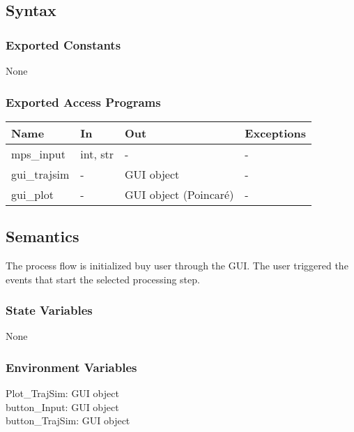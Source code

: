 \documentclass[12pt, titlepage]{article}
\begin{document}
\subsection{Syntax}

\subsubsection{Exported Constants}

None

\subsubsection{Exported Access Programs}

\begin{center}
\begin{tabular}{p{2cm} p{4cm} p{4cm} p{2cm}}
\hline
\textbf{Name} & \textbf{In} & \textbf{Out} & \textbf{Exceptions} \\
\hline
mps\_input & int, str & - & - \\
gui\_trajsim & - & GUI object & - \\
gui\_plot & - & GUI object (Poincar\'{e}) & - \\
\hline
\end{tabular}
\end{center}

\subsection{Semantics}

The \progname process flow is initialized buy user through the GUI. 
The user triggered the events that start the selected processing step.

\subsubsection{State Variables}

None

\subsubsection{Environment Variables}

\noindent Plot{\_}TrajSim: GUI object\\
button{\_}Input: GUI object\\
button{\_}TrajSim: GUI object\\

\end{document}
